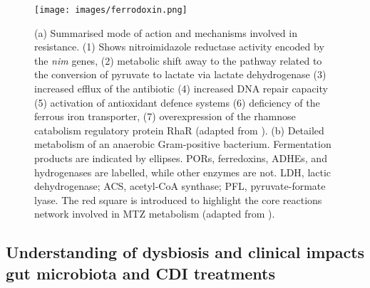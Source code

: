 \documentclass{article}
\begin{document}
\begin{figure}
\centering
\texttt{[image: images/ferrodoxin.png]}
\caption{\label{fig:ferrodoxin} (a) Summarised mode of action and mechanisms involved in resistance. (1) Shows nitroimidazole reductase activity encoded by the {\it nim} genes, (2) metabolic shift away to the pathway related to the conversion of pyruvate to lactate via lactate dehydrogenase (3) increased efflux of the antibiotic (4) increased DNA repair capacity (5) activation of antioxidant defence systems (6) deficiency of the ferrous iron transporter, (7) overexpression of the rhamnose catabolism regulatory protein RhaR (adapted from \cite{Thomas}). (b) Detailed metabolism of an anaerobic Gram-positive bacterium. Fermentation products are indicated by ellipses. PORs, ferredoxins, ADHEs, and hydrogenases are labelled, while other enzymes are not. LDH, lactic dehydrogenase; ACS, acetyl-CoA synthase; PFL, pyruvate-formate lyase. The red square is introduced to highlight the core reactions network involved in MTZ metabolism (adapted from \cite{Samuelson}).}
\end{figure}

\subsection{Understanding of dysbiosis and clinical impacts gut microbiota and CDI treatments}
\end{document}
